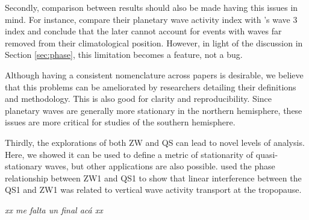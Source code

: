 \documentclass[draft,linenumbers]{agujournal2018}
\begin{document}
Secondly, comparison between results should also be made having this
issues in mind. For instance, \citet{Irving2015} compare their planetary
wave activity index with \citet{Raphael2004}'s wave 3 index and conclude
that the later cannot account for events with waves far removed from
their climatological position. However, in light of the discussion in
Section \ref{sec:phase}, this limitation becomes a feature, not a bug.

Although having a consistent nomenclature across papers is desirable, we
believe that this problems can be ameliorated by researchers detailing
their definitions and methodology. This is also good for clarity and
reproducibility. Since planetary waves are generally more stationary in
the northern hemisphere, these issues are more critical for studies of
the southern hemisphere.

Thirdly, the explorations of both ZW and QS can lead to novel levels of
analysis. Here, we showed it can be used to define a metric of
stationarity of quasi-stationary waves, but other applications are also
possible. \citet{Smith2012} used the phase relationship between ZW1 and
QS1 to show that linear interference between the QS1 and ZW1 was related
to vertical wave activity transport at the tropopause.

\emph{xx me falta un final acá xx}


\end{document}
